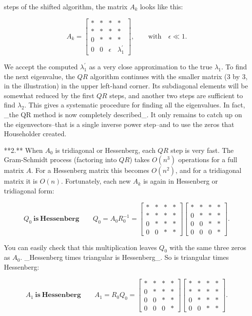 steps of the shifted algorithm, the matrix \(A_{k}\) looks like this:

\[A_{k}=\left[\begin{array}{ccccc}\ast&\ast&\ast&\ast\\ \ast&\ast&\ast&\ast\\ 0&\ast&\ast&\ast\\ \hline 0&0&\epsilon&\lambda_{1}^{\prime}\end{array}\right],\qquad\text{with} \quad\epsilon\ll 1.\]

We accept the computed \(\lambda_{1}^{\prime}\) as a very close approximation to the true \(\lambda_{1}\). To find the next eigenvalue, the \(QR\) algorithm continues with the smaller matrix (3 by 3, in the illustration) in the upper left-hand corner. Its subdiagonal elements will be somewhat reduced by the first \(QR\) steps, and another two steps are sufficient to find \(\lambda_{2}\). This gives a systematic procedure for finding all the eigenvalues. In fact, _the QR method is now completely described_. It only remains to catch up on the eigenvectors--that is a single inverse power step--and to use the zeros that Householder created.

**2.** When \(A_{0}\) is tridiagonal or Hessenberg, each \(QR\) step is very fast. The Gram-Schmidt process (factoring into \(QR\)) takes \(O(n^{3})\) operations for a full matrix \(A\). For a Hessenberg matrix this becomes \(O(n^{2})\), and for a tridiagonal matrix it is \(O(n)\). Fortunately, each new \(A_{k}\) is again in Hessenberg or tridiagonal form:

\[Q_{0}\ \mathbf{is\ Hessenberg}\qquad Q_{0}=A_{0}R_{0}^{-1}=\begin{bmatrix} \ast&\ast&\ast&\ast\\ \ast&\ast&\ast&\ast\\ 0&\ast&\ast&\ast\\ 0&0&\ast&\ast\end{bmatrix}\begin{bmatrix}\ast&\ast&\ast&\ast\\ 0&\ast&\ast&\ast\\ 0&0&\ast&\ast\\ 0&0&0&\ast\end{bmatrix}.\]

You can easily check that this multiplication leaves \(Q_{0}\) with the same three zeros as \(A_{0}\). _Hessenberg times triangular is Hessenberg_. So is triangular times Hessenberg:

\[A_{1}\ \mathbf{is\ Hessenberg}\qquad A_{1}=R_{0}Q_{0}=\begin{bmatrix}\ast& \ast&\ast&\ast\\ 0&\ast&\ast&\ast\\ 0&0&\ast&\ast\\ 0&0&0&\ast\end{bmatrix}\begin{bmatrix}\ast&\ast&\ast&\ast\\ \ast&\ast&\ast&\ast\\ 0&\ast&\ast&\ast\\ 0&0&\ast&\ast\end{bmatrix}.\]


